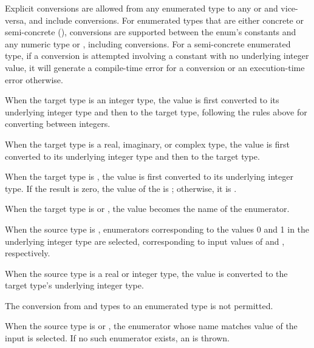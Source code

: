 Explicit conversions are allowed from any enumerated type to any
 or  and vice-versa, and include  conversions.
For enumerated types that are either concrete or semi-concrete
(), conversions are supported between the
enum's constants and any numeric type or ,
including  conversions.  For a semi-concrete enumerated
type, if a conversion is attempted involving a constant with no
underlying integer value, it will generate a compile-time error for
a  conversion or an execution-time error otherwise.

When the target type is an integer type, the value is first converted to its
underlying integer type and then to the target type, following the rules above
for converting between integers.

When the target type is a real, imaginary, or complex type, the value
is first converted to its underlying integer type and then to the
target type.

When the target type is , the value is first converted to its
underlying integer type.  If the result is zero, the value of the 
is ; otherwise, it is .

When the target type is  or , the value becomes the
name of the enumerator.

When the source type is , enumerators corresponding to the values 0
and 1 in the underlying integer type are selected, corresponding to input values
of  and , respectively.


When the source type is a real or integer type, the value is converted to the
target type's underlying integer type.  

The conversion from  and  types to an enumerated type is not
permitted.

When the source type is  or , the enumerator whose name
matches value of the input is selected.  If no such enumerator exists, an
 is thrown.

